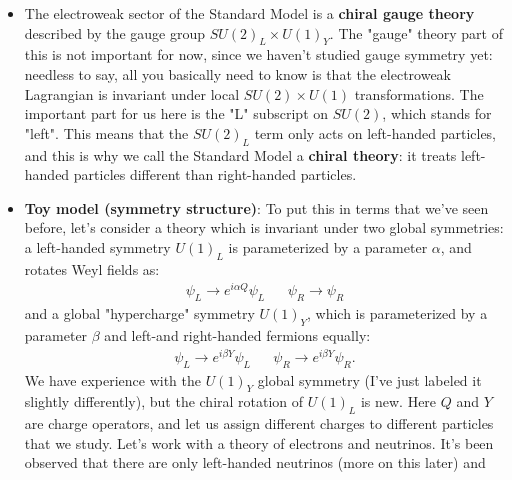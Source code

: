 \documentclass[12pt, oneside]{article}   	%
\theoremstyle{definition}
\begin{document}
\begin{itemize}

	\item The electroweak sector of the Standard Model is a \textbf{chiral gauge theory} described by the gauge group $SU(2)_L \times U(1)_Y$. The "gauge" theory part of this is not important for now, since we haven't studied gauge symmetry yet: needless to say, all you basically need to know is that the electroweak Lagrangian is invariant under local $SU(2)\times U(1)$ transformations. The important part for us here is the "L" subscript on $SU(2)$, which stands for "left". This means that the $SU(2)_L$ term only acts on left-handed particles, and this is why we call the Standard Model a \textbf{chiral theory}: it treats left-handed particles different than right-handed particles. 
	
	\item \textbf{Toy model (symmetry structure)}: To put this in terms that we've seen before, let's consider a theory which is invariant under two global symmetries: a left-handed symmetry $U(1)_L$ is parameterized by a parameter $\alpha$, and rotates Weyl fields as:
	\begin{align}
		\psi_L\longrightarrow e^{i\alpha Q} \psi_L && \psi_R\longrightarrow \psi_R \label{eq:u1L_sym}
	\end{align}
	and a global "hypercharge" symmetry $U(1)_Y$, which is parameterized by a parameter $\beta$ and left-and right-handed fermions equally:
	\begin{align}
		\psi_L\longrightarrow e^{i\beta Y} \psi_L && \psi_R\longrightarrow e^{i\beta Y} \psi_R. \label{eq:u1Y_sym}
	\end{align}
	We have experience with the $U(1)_Y$ global symmetry (I've just labeled it slightly differently), but the chiral rotation of $U(1)_L$ is new. Here $Q$ and $Y$ are charge operators, and let us assign different charges to different particles that we study. Let's work with a theory of electrons and neutrinos. It's been observed that there are only left-handed neutrinos (more on this later) and 
	

\end{itemize}
\end{document}
